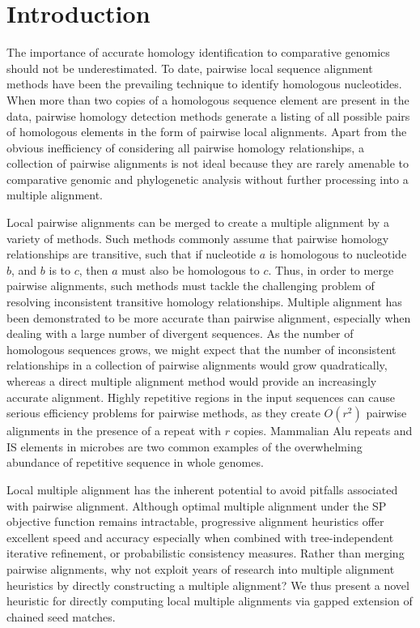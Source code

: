 \documentclass{ws-procs975x65}
\begin{document}

\section{Introduction}
The importance of accurate homology identification to comparative genomics should not be underestimated\cite{Kumar07}. To date, pairwise local sequence alignment methods\cite{ref-blastz,ref-ssearch} have been the prevailing technique to identify homologous nucleotides.  When more than two copies of a homologous sequence element are present in the data, pairwise homology detection methods generate a listing of all possible pairs of homologous elements in the form of pairwise local alignments.  Apart from the obvious inefficiency of considering all pairwise homology relationships, a collection of pairwise alignments is not ideal because they are rarely amenable to comparative genomic and phylogenetic analysis without further processing into a multiple alignment.

Local pairwise alignments can be merged to create a multiple alignment by a variety of methods\cite{ref-tba,ref-aba,ref-dialign,ref-related1}. Such methods commonly assume that pairwise homology relationships are transitive, such that if nucleotide $a$ is homologous to nucleotide $b$, and $b$ is to $c$, then $a$ must also be homologous to $c$.  Thus, in order to merge pairwise alignments, such methods must tackle the challenging problem of resolving inconsistent transitive homology relationships.  Multiple alignment has been demonstrated to be more accurate than pairwise alignment, especially when dealing with a large number of divergent sequences\cite{ref-mlagan,ref-aubergene}.  As the number of homologous sequences grows, we might expect that the number of inconsistent relationships in a collection of pairwise alignments would grow quadratically, whereas a direct multiple alignment method would provide an increasingly accurate alignment.  Highly repetitive regions in the input sequences can cause serious efficiency problems for pairwise methods, as they create $O(r^{2})$ pairwise alignments in the presence of a repeat with $r$ copies.  Mammalian Alu repeats and IS elements in microbes are two common examples of the overwhelming abundance of repetitive sequence in whole genomes.

Local multiple alignment has the inherent potential to avoid pitfalls associated with pairwise alignment. Although optimal multiple alignment under the SP objective function remains intractable\cite{ref-wangjiang}, progressive alignment heuristics offer excellent speed and accuracy\cite{ref-clustalw,ref-tcoffee} especially when combined with tree-independent iterative refinement\cite{ref-muscle}, or probabilistic consistency measures\cite{ref-probcons}. Rather than merging pairwise alignments, why not exploit years of research into multiple alignment heuristics by directly constructing a multiple alignment? We thus present a novel heuristic for directly computing local multiple alignments via gapped extension of chained seed matches.
\end{document}
